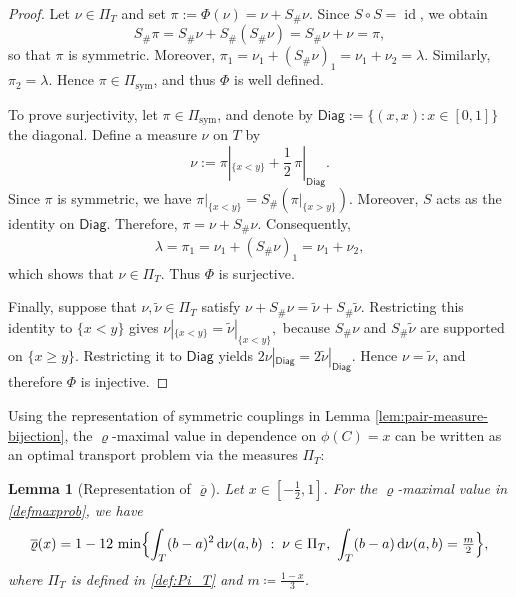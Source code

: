 \documentclass{article}
\newtheorem{lemma}[theorem]{Lemma}
\newcommand{\de}{\mathrm{\,d}}
\newcommand{\lam}{\lambda}
\begin{document}
\begin{proof}
Let \(\nu\in\Pi_T\) and set \(\pi:=\Phi(\nu)=\nu+S_\#\nu.\) Since \(S\circ S=\operatorname{id}\), we obtain
\[
    S_\#\pi
    =
    S_\#\nu+S_\#(S_\#\nu)
    =
    S_\#\nu+\nu
    =
    \pi,
\]
so that \(\pi\) is symmetric.
Moreover, \(\pi_1 = \nu_1 + (S_\#\nu)_1 = \nu_1 + \nu_2 = \lam\).
Similarly, \(\pi_2 = \lam\).
Hence \(\pi\in\Pi_{\mathrm{sym}}\), and thus \(\Phi\) is well defined.

To prove surjectivity, let \(\pi\in\Pi_{\mathrm{sym}}\), and denote by \(\mathsf{Diag}:=\{(x,x):x\in[0,1]\}\) the diagonal.
Define a measure \(\nu\) on \(T\) by
\[
    \nu
    :=
    \pi|_{\{x<y\}}
    +
    \frac12\,\pi|_{\mathsf{Diag}}.
\]
Since \(\pi\) is symmetric, we have \(\pi|_{\{x<y\}} = S_\#(\pi|_{\{x>y\}})\).
Moreover, \(S\) acts as the identity on \(\mathsf{Diag}\).
Therefore, \(\pi=\nu+S_\#\nu\).
Consequently,
\begin{align*}
    \lam
    =
    \pi_1 = \nu_1 + (S_\#\nu)_1 = \nu_1 + \nu_2, 
\end{align*}
which shows that \(\nu\in\Pi_T\).
Thus \(\Phi\) is surjective.

Finally, suppose that \(\nu,\widetilde\nu\in\Pi_T\) satisfy \(\nu+S_\#\nu = \widetilde\nu+S_\#\widetilde\nu. \) Restricting this identity to \(\{x<y\}\) gives \(\nu|_{\{x<y\}} = \widetilde\nu|_{\{x<y\}}, \) because \(S_\#\nu\) and \(S_\#\widetilde\nu\) are supported on \(\{x\ge y\}\).
Restricting it to \(\mathsf{Diag}\) yields
\(
    2\nu|_{\mathsf{Diag}}
    =
    2\widetilde\nu|_{\mathsf{Diag}}.
\)
Hence \(\nu=\widetilde\nu\), and therefore \(\Phi\) is injective.
\end{proof}


Using the representation of symmetric couplings in Lemma \ref{lem:pair-measure-bijection}, the \(\varrho\)-maximal value in dependence on \(\phi(C) = x\) can be written as an optimal transport problem via the measures \(\Pi_T\):


\begin{lemma}[Representation of \(\overline{\varrho}\)]\label{prop:pairlp}
	Let $x\in[-\tfrac12,1]$. For the \(\varrho\)-maximal value in \eqref{defmaxprob}, we have
    \begin{align}\label{eq:lp}
        \overline{\varrho}(x) = 1 - 12\,\min\Bigl\{
			\int_T(b-a)^2\de\nu(a,b)
			\;:\;
			\nu\in\Pi_T,\ \int_T(b-a)\de\nu(a,b) = \tfrac{m}{2}
		\Bigr\},
    \end{align}
    where \(\Pi_T\) is defined in \eqref{def:Pi_T} and \(m\coloneqq\tfrac{1-x}{3}\).
\end{lemma}
\end{document}

